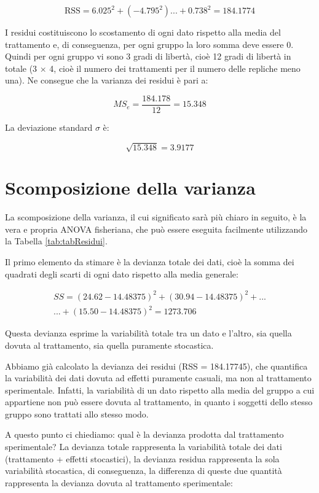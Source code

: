 \documentclass[a4paper,12pt,oneside]{book}
\begin{document}
\[\textrm{RSS} = 6.025^2 + (-4.795^2) ... + 0.738^2 = 184.1774\]

I residui costituiscono lo scostamento di ogni dato rispetto alla media del trattamento e, di conseguenza, per ogni gruppo la loro somma deve essere 0. Quindi per ogni gruppo vi sono 3 gradi di libertà, cioè 12 gradi di libertà in totale (3 \(\times\) 4, cioè il numero dei trattamenti per il numero delle repliche meno una). Ne consegue che la varianza dei residui è pari a:

\[MS_{e}  = \frac{184.178}{12} = 15.348\]

La deviazione standard \(\sigma\) è:

\[ \sqrt{15.348} = 3.9177\]

\hypertarget{scomposizione-della-varianza}{%
\section{Scomposizione della varianza}\label{scomposizione-della-varianza}}

La scomposizione della varianza, il cui significato sarà più chiaro in seguito, è la vera e propria ANOVA fisheriana, che può essere eseguita facilmente utilizzando la Tabella \ref{tab:tabResidui}.

Il primo elemento da stimare è la devianza totale dei dati, cioè la somma dei quadrati degli scarti di ogni dato rispetto alla media generale:

\[\begin{array}{c}
SS = \left(24.62 - 14.48375\right)^2 + \left(30.94 - 14.48375\right)^2 + ... \\
... + \left(15.50 - 14.48375\right)^2 = 1273.706
\end{array}\]

Questa devianza esprime la variabilità totale tra un dato e l'altro, sia quella dovuta al trattamento, sia quella puramente stocastica.

Abbiamo già calcolato la devianza dei residui (RSS = 184.17745), che quantifica la variabilità dei dati dovuta ad effetti puramente casuali, ma non al trattamento sperimentale. Infatti, la variabilità di un dato rispetto alla media del gruppo a cui appartiene non può essere dovuta al trattamento, in quanto i soggetti dello stesso gruppo sono trattati allo stesso modo.

A questo punto ci chiediamo: qual è la devianza prodotta dal trattamento sperimentale? La devianza totale rappresenta la variabilità totale dei dati (trattamento + effetti stocastici), la devianza residua rappresenta la sola variabilità stocastica, di conseguenza, la differenza di queste due quantità rappresenta la devianza dovuta al trattamento sperimentale:
\end{document}
